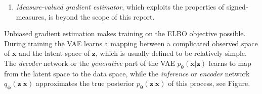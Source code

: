 \begin{enumerate}
\begin{figure}
		\caption[The reparametrization trick]{The reparametrization trick, adapted from~\cite{kingma2017variational}. The stochasticity of the $\mathbf{z}$ node is pushed out into a separate input to the same node, resulting in deterministic gradients w.r.t $\boldsymbol{\phi}$ through the node.}
		\label{fig:reparam}
	\end{figure}
	This was the gradient estimator originally used in the VAE implementation~\cite{kingma2013auto} there named as the \emph{reparametrization trick}, see also Figure~\ref{fig:reparam}. In many cases the transformation paths are so simple they can be implemented in one line of code, referred to as \emph{one-liners}. The pathwise-estimator can only be used on differentiable cost functions, but is easy to implement and crucially has lower variance than the score-function estimator. 
	
	\item \emph{Measure-valued gradient estimator}, which exploits the properties of signed-measures, is beyond the scope of this report.	
\end{enumerate}
Unbiased gradient estimation makes training on the ELBO objective possible. During training the VAE learns a mapping between a complicated observed space of $\mathbf{x}$ and the latent space of $\mathbf{z}$, which is usually defined to be relatively simple. The \emph{decoder} network or the \emph{generative} part of the VAE $p_{\boldsymbol{\theta}}(\mathbf{x} | \mathbf{z})$ learns to map from the latent space to the data space, while the \emph{inference} or \emph{encoder} network $q_{\mathbf{\phi}}(\mathbf{z}|\mathbf{x})$ approximates the true posterior $p_{\mathbf{\theta}}(\mathbf{z}|\mathbf{x})$ of this process, see Figure. 

